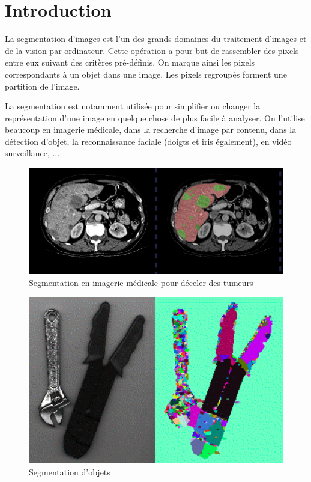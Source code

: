 \section{Introduction}
La segmentation d'images est l'un des grands domaines du traitement d'images et de la vision par ordinateur. Cette opération a pour but de rassembler des pixels entre eux suivant des critères pré-définis. On marque ainsi les pixels correspondants à un objet dans une image. Les pixels regroupés forment une partition de l'image.

\bigskip

La segmentation est notamment utilisée pour simplifier ou changer la représentation d'une image en quelque chose de plus facile à analyser. On l'utilise beaucoup en imagerie médicale, dans la recherche d'image par contenu, dans la détection d'objet, la reconnaissance faciale (doigts et iris également), en vidéo surveillance, ...

\begin{figure}[H]
\centering
\includegraphics[scale=0.5]{images/imagerie.png}
\caption{Segmentation en imagerie médicale pour déceler des tumeurs}
\end{figure}

\begin{figure}[H]
\centering
\includegraphics[scale=0.4]{images/segmentation.png}
\caption{Segmentation d'objets}
\end{figure}

